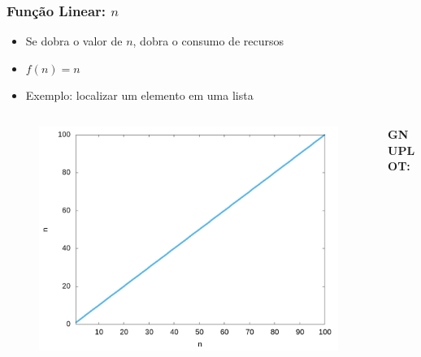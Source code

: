 \documentclass[aspectratio=169]{beamer}
\begin{document}
\begin{frame}\frametitle{Função Linear: $n$}
\begin{itemize}
	\item Se dobra o valor de $n$, dobra o consumo de recursos
	\item $f(n) = n$
	\item Exemplo: localizar um elemento em uma lista
\end{itemize}
\vspace{-5mm}
\begin{columns}[T]
\begin{column}{0.6\linewidth}
\begin{figure}[h]
	\centering
	\includegraphics[height=0.5\paperheight]{graficos/n.jpg}
\end{figure}
\end{column}
\begin{column}{0.4\linewidth}
\vspace{5mm}
{\fontsize{0}{4}\selectfont{}\textbf{GNUPLOT:}

}
\end{column}
\end{columns}
\end{frame}
\end{document}
